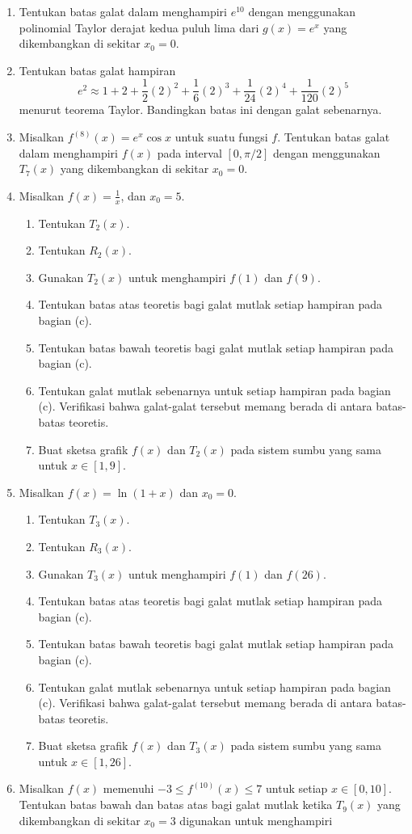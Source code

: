 \begin{enumerate}
\item Tentukan batas galat dalam menghampiri $e^{10}$ dengan menggunakan
polinomial Taylor derajat kedua puluh lima dari $g(x)=e^{x}$ yang
dikembangkan di sekitar $x_{0}=0$.
\item Tentukan batas galat hampiran 
\[
e^{2}\approx1+2+\frac{1}{2}(2)^{2}+\frac{1}{6}(2)^{3}+\frac{1}{24}(2)^{4}+\frac{1}{120}(2)^{5}
\]
menurut teorema Taylor. Bandingkan batas ini dengan galat sebenarnya.
\item Misalkan $f^{(8)}(x)=e^{x}\cos x$ untuk suatu fungsi $f$. Tentukan
batas galat dalam menghampiri $f(x)$ pada interval $[0,\pi/2]$ dengan
menggunakan $T_{7}(x)$ yang dikembangkan di sekitar $x_{0}=0$.
\item \label{exc:taylor4}Misalkan $f(x)=\frac{1}{x}$, dan $x_{0}=5$. \hasasolution 

\begin{enumerate}
\item Tentukan $T_{2}(x)$.
\item Tentukan $R_{2}(x)$.
\item Gunakan $T_{2}(x)$ untuk menghampiri $f(1)$ dan $f(9)$.
\item Tentukan batas atas teoretis bagi galat mutlak setiap hampiran pada
bagian (c).
\item Tentukan batas bawah teoretis bagi galat mutlak setiap hampiran pada
bagian (c).
\item Tentukan galat mutlak sebenarnya untuk setiap hampiran pada bagian
(c). Verifikasi bahwa galat-galat tersebut memang berada di antara
batas-batas teoretis.
\item Buat sketsa grafik $f(x)$ dan $T_{2}(x)$ pada sistem sumbu yang
sama untuk $x\in[1,9]$.
\end{enumerate}
\item Misalkan $f(x)=\ln(1+x)$ dan $x_{0}=0$.

\begin{enumerate}
\item Tentukan $T_{3}(x)$.
\item Tentukan $R_{3}(x)$.
\item Gunakan $T_{3}(x)$ untuk menghampiri $f(1)$ dan $f(26)$.
\item Tentukan batas atas teoretis bagi galat mutlak setiap hampiran pada
bagian (c).
\item Tentukan batas bawah teoretis bagi galat mutlak setiap hampiran pada
bagian (c).
\item Tentukan galat mutlak sebenarnya untuk setiap hampiran pada bagian
(c). Verifikasi bahwa galat-galat tersebut memang berada di antara
batas-batas teoretis.
\item Buat sketsa grafik $f(x)$ dan $T_{3}(x)$ pada sistem sumbu yang
sama untuk $x\in[1,26]$.
\end{enumerate}
\item Misalkan $f(x)$ memenuhi $-3\leq f^{(10)}(x)\leq7$ untuk setiap
$x\in[0,10]$. Tentukan batas bawah dan batas atas bagi galat mutlak
ketika $T_{9}(x)$ yang dikembangkan di sekitar $x_{0}=3$ digunakan
untuk menghampiri


\end{enumerate}
